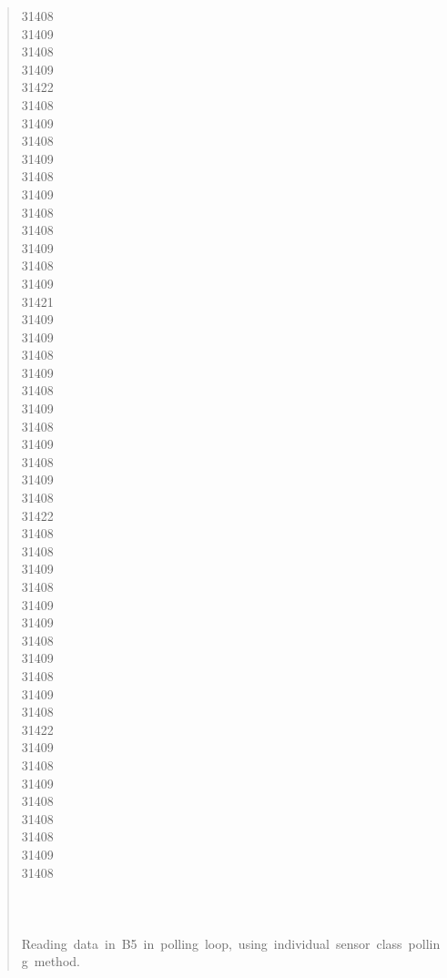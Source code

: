 \documentclass[letterpaper]{article}
\begin{document}
\begin{quote}
{31408\\
31409\\
31408\\
31409\\
31422\\
31408\\
31409\\
31408\\
31409\\
31408\\
31409\\
31408\\
31408\\
31409\\
31408\\
31409\\
31421\\
31409\\
31409\\
31408\\
31409\\
31408\\
31409\\
31408\\
31409\\
31408\\
31409\\
31408\\
31422\\
31408\\
31408\\
31409\\
31408\\
31409\\
31409\\
31408\\
31409\\
31408\\
31409\\
31408\\
31422\\
31409\\
31408\\
31409\\
31408\\
31408\\
31408\\
31409\\
31408\\
~\\
~\\
~\\
Reading~data~in~B5~in~polling~loop,~using~individual~sensor~class~polling~method.\\
}
\end{quote}
\end{document}
